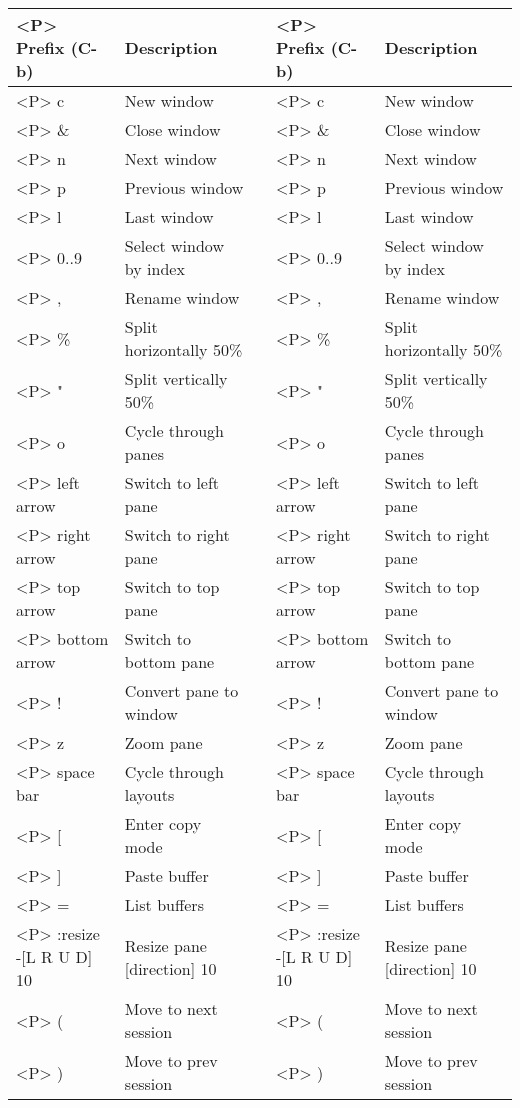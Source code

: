\documentclass[11pt]{article}
\begin{document}
\begin{tabular}{lllll}
\hline
<P> Prefix (C-b) & Description &  & <P> Prefix (C-b) & Description\\
\hline
<P> c & New window &  & <P> c & New window\\
<P> \& & Close window &  & <P> \& & Close window\\
<P> n & Next window &  & <P> n & Next window\\
<P> p & Previous window &  & <P> p & Previous window\\
<P> l & Last window &  & <P> l & Last window\\
<P> 0..9 & Select window by index &  & <P> 0..9 & Select window by index\\
<P> , & Rename window &  & <P> , & Rename window\\
<P> \% & Split horizontally 50\% &  & <P> \% & Split horizontally 50\%\\
<P> " & Split vertically 50\% &  & <P> " & Split vertically 50\%\\
<P> o & Cycle through panes &  & <P> o & Cycle through panes\\
<P> left arrow & Switch to left pane &  & <P> left arrow & Switch to left pane\\
<P> right arrow & Switch to right pane &  & <P> right arrow & Switch to right pane\\
<P> top arrow & Switch to top pane &  & <P> top arrow & Switch to top pane\\
<P> bottom arrow & Switch to bottom pane &  & <P> bottom arrow & Switch to bottom pane\\
<P> ! & Convert pane to window &  & <P> ! & Convert pane to window\\
<P> z & Zoom pane &  & <P> z & Zoom pane\\
<P> space bar & Cycle through layouts &  & <P> space bar & Cycle through layouts\\
<P> [ & Enter copy mode &  & <P> [ & Enter copy mode\\
<P> ] & Paste buffer &  & <P> ] & Paste buffer\\
<P> = & List buffers &  & <P> = & List buffers\\
<P> :resize -[L R U D] 10 & Resize pane [direction] 10 &  & <P> :resize -[L R U D] 10 & Resize pane [direction] 10\\
<P> ( & Move to next session &  & <P> ( & Move to next session\\
<P> ) & Move to prev session &  & <P> ) & Move to prev session\\
\hline
\end{tabular}
\end{document}
